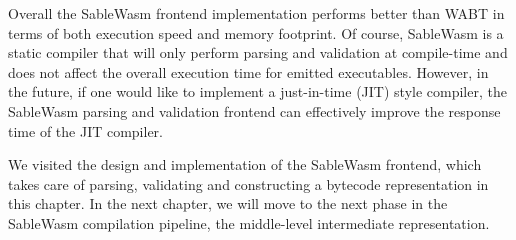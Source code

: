 Overall the SableWasm frontend implementation performs better than WABT in
terms of both execution speed and memory footprint. Of course, SableWasm is a
static compiler that will only perform parsing and validation at compile-time
and does not affect the overall execution time for emitted executables. However,
in the future, if one would like to implement a just-in-time (JIT) style
compiler, the SableWasm parsing and validation frontend can effectively improve
the response time of the JIT compiler.

We visited the design and implementation of the SableWasm frontend, which takes
care of parsing, validating and constructing a bytecode representation in this
chapter. In the next chapter, we will move to the next phase in the SableWasm
compilation pipeline, the middle-level intermediate representation.